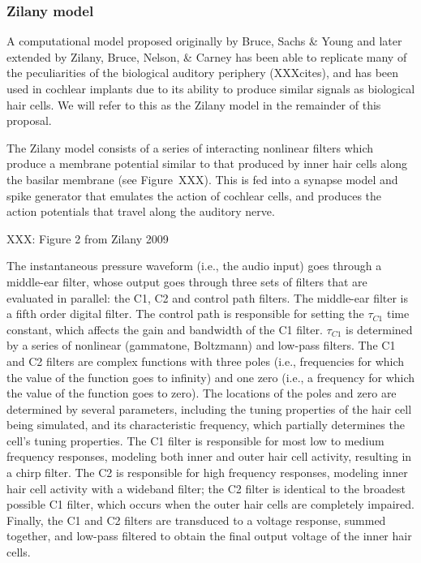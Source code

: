 \documentclass{article}
\begin{document}
\subsubsection{Zilany model}

A computational model proposed originally by
Bruce, Sachs \& Young
and later extended by Zilany, Bruce, Nelson, \& Carney
has been able to replicate
many of the peculiarities
of the biological auditory periphery (XXXcites),
and has been used in cochlear implants
due to its ability to produce
similar signals as biological hair cells.
We will refer to this as the
Zilany model in the remainder of this proposal.

The Zilany model consists of a series
of interacting nonlinear filters
which produce a membrane potential
similar to that produced
by inner hair cells along the basilar membrane
(see Figure~XXX).
This is fed into a synapse model and spike generator
that emulates the action of cochlear cells,
and produces the action potentials
that travel along the auditory nerve.

XXX: Figure 2 from Zilany 2009

The instantaneous pressure waveform
(i.e., the audio input)
goes through a middle-ear filter,
whose output goes through three sets of filters
that are evaluated in parallel:
the C1, C2 and control path filters.
The middle-ear filter is a fifth order digital filter.
The control path is responsible for
setting the $\tau_{C1}$ time constant,
which affects the gain and bandwidth
of the C1 filter.
$\tau_{C1}$ is determined by
a series of nonlinear
(gammatone, Boltzmann)
and low-pass filters.
The C1 and C2 filters are
complex functions with three poles
(i.e., frequencies for which the
value of the function goes to infinity)
and one zero (i.e., a frequency
for which the value of the function goes to zero).
The locations of the poles and zero
are determined by
several parameters, including
the tuning properties of
the hair cell being simulated,
and its characteristic frequency,
which partially determines the cell's
tuning properties.
The C1 filter is responsible for most
low to medium frequency responses,
modeling both inner and outer hair cell
activity, resulting in a chirp filter.
The C2 is responsible for high frequency responses,
modeling inner hair cell activity
with a wideband filter;
the C2 filter is identical
to the broadest possible C1 filter,
which occurs when the outer hair cells
are completely impaired.
Finally, the C1 and C2 filters
are transduced to a voltage response,
summed together, and low-pass filtered
to obtain the final output voltage
of the inner hair cells.
\end{document}

